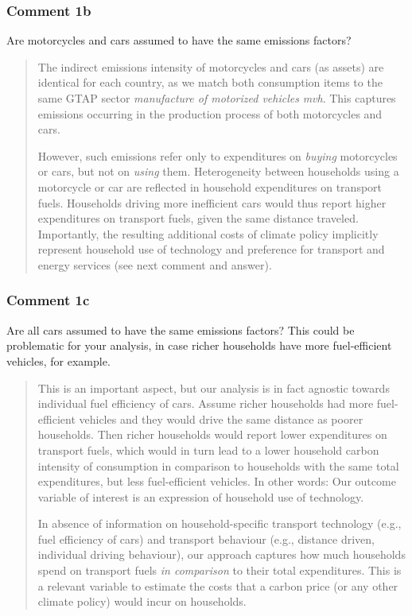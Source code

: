 \documentclass[11pt]{article}
\newenvironment{response}
{\begin{quote}\color{black}}
{\end{quote}}
\begin{document}
\subsubsection*{Comment 1b}\label{comment_R2_1b}

\begin{commentbox}
    Are motorcycles and cars assumed to have the same emissions factors?
\end{commentbox}

\begin{response}
    The indirect emissions intensity of motorcycles and cars (as assets) are identical for each country, as we match both consumption items to the same GTAP sector \textit{manufacture of motorized vehicles} \textit{mvh}. This captures emissions occurring in the production process of both motorcycles and cars.

    However, such emissions refer only to expenditures on \textit{buying} motorcycles or cars, but not on \textit{using} them. Heterogeneity between households using a motorcycle or car are reflected in household expenditures on transport fuels. Households driving more inefficient cars would thus report higher expenditures on transport fuels, given the same distance traveled. Importantly, the resulting additional costs of climate policy implicitly represent household use of technology and preference for transport and energy services (see next comment and answer).
\end{response}

\subsubsection*{Comment 1c}\label{comment_R2_1c}

\begin{commentbox}
    Are all cars assumed to have the same emissions factors? This could be problematic for your analysis, in case richer households have more fuel-efficient vehicles, for example.
\end{commentbox}

\begin{response}
    This is an important aspect, but our analysis is in fact agnostic towards individual fuel efficiency of cars. Assume richer households had more fuel-efficient vehicles and they would drive the same distance as poorer households. Then richer households would report lower expenditures on transport fuels, which would in turn lead to a lower household carbon intensity of consumption in comparison to households with the same total expenditures, but less fuel-efficient vehicles. In other words: Our outcome variable of interest is an expression of household use of technology.

    In absence of information on household-specific transport technology (e.g., fuel efficiency of cars) and transport behaviour (e.g., distance driven, individual driving behaviour), our approach captures how much households spend on transport fuels \textit{in comparison} to their total expenditures. This is a relevant variable to estimate the costs that a carbon price (or any other climate policy) would incur on households.
\end{response}
\end{document}
